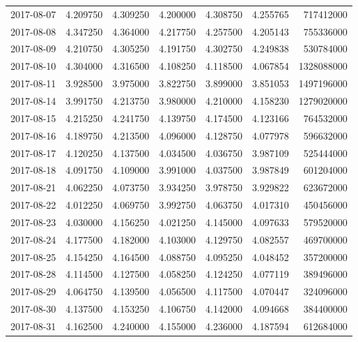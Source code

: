 \begin{tabular}{lrrrrrr}
2017-08-07 &    4.209750 &    4.309250 &    4.200000 &    4.308750 &    4.255765 &   717412000 \\
2017-08-08 &    4.347250 &    4.364000 &    4.217750 &    4.257500 &    4.205143 &   755336000 \\
2017-08-09 &    4.210750 &    4.305250 &    4.191750 &    4.302750 &    4.249838 &   530784000 \\
2017-08-10 &    4.304000 &    4.316500 &    4.108250 &    4.118500 &    4.067854 &  1328088000 \\
2017-08-11 &    3.928500 &    3.975000 &    3.822750 &    3.899000 &    3.851053 &  1497196000 \\
2017-08-14 &    3.991750 &    4.213750 &    3.980000 &    4.210000 &    4.158230 &  1279020000 \\
2017-08-15 &    4.215250 &    4.241750 &    4.139750 &    4.174500 &    4.123166 &   764532000 \\
2017-08-16 &    4.189750 &    4.213500 &    4.096000 &    4.128750 &    4.077978 &   596632000 \\
2017-08-17 &    4.120250 &    4.137500 &    4.034500 &    4.036750 &    3.987109 &   525444000 \\
2017-08-18 &    4.091750 &    4.109000 &    3.991000 &    4.037500 &    3.987849 &   601204000 \\
2017-08-21 &    4.062250 &    4.073750 &    3.934250 &    3.978750 &    3.929822 &   623672000 \\
2017-08-22 &    4.012250 &    4.069750 &    3.992750 &    4.063750 &    4.017310 &   450456000 \\
2017-08-23 &    4.030000 &    4.156250 &    4.021250 &    4.145000 &    4.097633 &   579520000 \\
2017-08-24 &    4.177500 &    4.182000 &    4.103000 &    4.129750 &    4.082557 &   469700000 \\
2017-08-25 &    4.154250 &    4.164500 &    4.088750 &    4.095250 &    4.048452 &   357200000 \\
2017-08-28 &    4.114500 &    4.127500 &    4.058250 &    4.124250 &    4.077119 &   389496000 \\
2017-08-29 &    4.064750 &    4.139500 &    4.056500 &    4.117500 &    4.070447 &   324096000 \\
2017-08-30 &    4.137500 &    4.153250 &    4.106750 &    4.142000 &    4.094668 &   384400000 \\
2017-08-31 &    4.162500 &    4.240000 &    4.155000 &    4.236000 &    4.187594 &   612684000 \\

\end{tabular}
